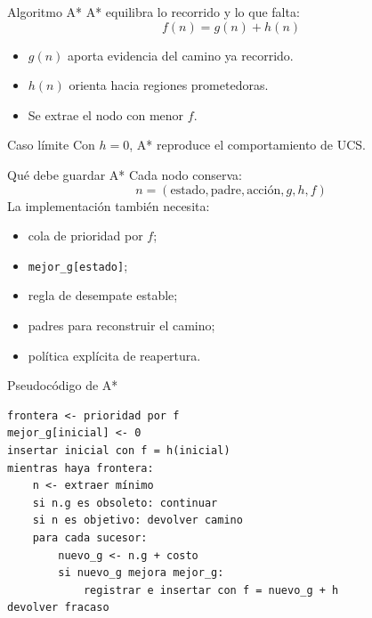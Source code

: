 \documentclass[aspectratio=169,11pt]{beamer}
\begin{document}
\begin{frame}{Algoritmo A*}
  A* equilibra lo recorrido y lo que falta:
  \[
    \boxed{f(n)=g(n)+h(n)}
  \]
  \begin{itemize}
    \item $g(n)$ aporta evidencia del camino ya recorrido.
    \item $h(n)$ orienta hacia regiones prometedoras.
    \item Se extrae el nodo con menor $f$.
  \end{itemize}
  \begin{block}{Caso límite}
    Con $h=0$, A* reproduce el comportamiento de UCS.
  \end{block}
\end{frame}

\begin{frame}{Qué debe guardar A*}
  Cada nodo conserva:
  \[
    n=(\text{estado},\text{padre},\text{acción},g,h,f)
  \]
  La implementación también necesita:
  \begin{itemize}
    \item cola de prioridad por $f$;
    \item \texttt{mejor\_g[estado]};
    \item regla de desempate estable;
    \item padres para reconstruir el camino;
    \item política explícita de reapertura.
  \end{itemize}
\end{frame}

\begin{frame}[fragile]{Pseudocódigo de A*}
\small
\begin{verbatim}
frontera <- prioridad por f
mejor_g[inicial] <- 0
insertar inicial con f = h(inicial)
mientras haya frontera:
    n <- extraer mínimo
    si n.g es obsoleto: continuar
    si n es objetivo: devolver camino
    para cada sucesor:
        nuevo_g <- n.g + costo
        si nuevo_g mejora mejor_g:
            registrar e insertar con f = nuevo_g + h
devolver fracaso
\end{verbatim}
\end{frame}
\end{document}
